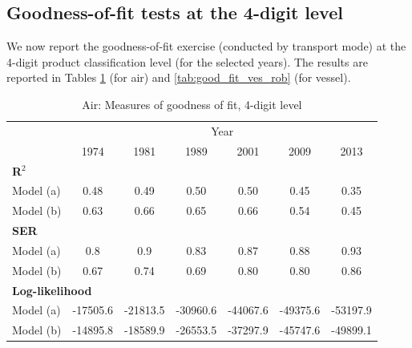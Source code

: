\documentclass[a4paper,11pt]{article}
\begin{document}
\subsection{Goodness-of-fit tests at the 4-digit level}

We now report the goodness-of-fit exercise (conducted by transport mode) at the 4-digit product classification level (for the selected years).
The results are reported in Tables \ref{tab:good_fit_air_rob} (for air) and \ref{tab:good_fit_ves_rob} (for vessel).
\begin{table}[htbp]
  \centering
  \caption{Air: Measures of goodness of fit, 4-digit level}
\begin{center}
\label{tab:good_fit_air_rob}%
  \footnotesize{
\begin{tabular}{l|cccccc}
\hline
\hline
      & \multicolumn{6}{c}{Year}              \\
      & \multicolumn{1}{c}{1974} & \multicolumn{1}{c}{1981} & \multicolumn{1}{c}{1989} & \multicolumn{1}{c}{2001} & \multicolumn{1}{c}{2009} & \multicolumn{1}{c}{2013}  \\
\hline
\multicolumn{7}{l}{\textbf{R$^2$}}      \\ \hline
Model (a)& \multicolumn{1}{c}{0.48} & \multicolumn{1}{c}{0.49} & \multicolumn{1}{c}{0.50} & \multicolumn{1}{c}{0.50} & \multicolumn{1}{c}{0.45} & \multicolumn{1}{c}{0.35} \\
Model (b) & \multicolumn{1}{c}{0.63} & \multicolumn{1}{c}{0.66} & \multicolumn{1}{c}{0.65} & \multicolumn{1}{c}{0.66} & \multicolumn{1}{c}{0.54} & \multicolumn{1}{c}{0.45} \\ \hline
\multicolumn{7}{l}{\textbf{SER} }  \\ \hline
Model (a)& \multicolumn{1}{c}{0.8} & \multicolumn{1}{c}{0.9} & \multicolumn{1}{c}{0.83} &   0.87    & \multicolumn{1}{c}{0.88} & \multicolumn{1}{c}{0.93}  \\
Model (b) & \multicolumn{1}{c}{0.67} & \multicolumn{1}{c}{0.74} & \multicolumn{1}{c}{0.69} &  0.80     & \multicolumn{1}{c}{0.80} & \multicolumn{1}{c}{0.86}  \\
\multicolumn{7}{l}{\textbf{Log-likelihood} } \\ \hline
Model (a) & \multicolumn{1}{c}{-17505.6} & \multicolumn{1}{c}{-21813.5} & \multicolumn{1}{c}{-30960.6} & \multicolumn{1}{c}{-44067.6} & \multicolumn{1}{c}{-49375.6} & \multicolumn{1}{c}{-53197.9}  \\
Model (b) & \multicolumn{1}{c}{-14895.8} & \multicolumn{1}{c}{-18589.9} & \multicolumn{1}{c}{-26553.5} & \multicolumn{1}{c}{-37297.9} & \multicolumn{1}{c}{-45747.6} & \multicolumn{1}{c}{-49899.1}  \\ \hline

\end{tabular}}
\end{center}
\end{table}
\end{document}
